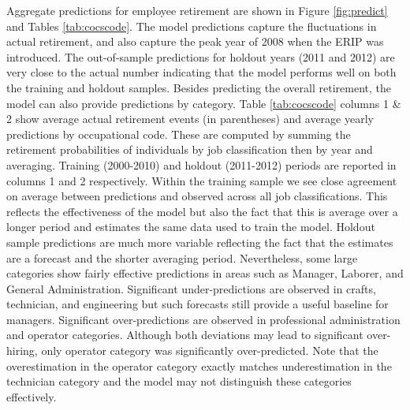 Aggregate predictions for employee retirement are shown in Figure \ref{fig:predict} and Tables \ref{tab:cocscode}. %
The model predictions capture the fluctuations in actual retirement, and also capture the peak year of 2008 when the ERIP was introduced. The out-of-sample predictions for holdout years (2011 and 2012) are very close to the actual number indicating that the model performs well on both the training and holdout samples. Besides predicting the overall retirement, the model can also provide predictions by category. Table \ref{tab:cocscode} columns 1 \& 2 show average actual retirement events (in parentheses) and average yearly predictions by occupational code. These are computed by summing the retirement probabilities of individuals by job classification then by year and averaging.  Training (2000-2010) and holdout (2011-2012) periods are reported in columns 1 and 2 respectively.  Within the training sample we see close agreement on average between predictions and observed across all job classifications. This reflects the effectiveness of the model but also the fact that this is average over a longer period and estimates the same data used to train the model.  Holdout sample predictions are much more variable reflecting the fact that the estimates are a forecast and the shorter averaging period.  Nevertheless, some large categories show fairly effective predictions in areas such as Manager, Laborer, and General Administration.  Significant under-predictions are observed in crafts, technician, and engineering but such forecasts still provide a useful baseline for managers.  Significant over-predictions are observed in professional administration and operator categories. Although both deviations may lead to significant over-hiring, only operator category was significantly over-predicted. Note that the overestimation in the operator category exactly matches underestimation in the technician category and the model may not distinguish these categories effectively.%
	 
